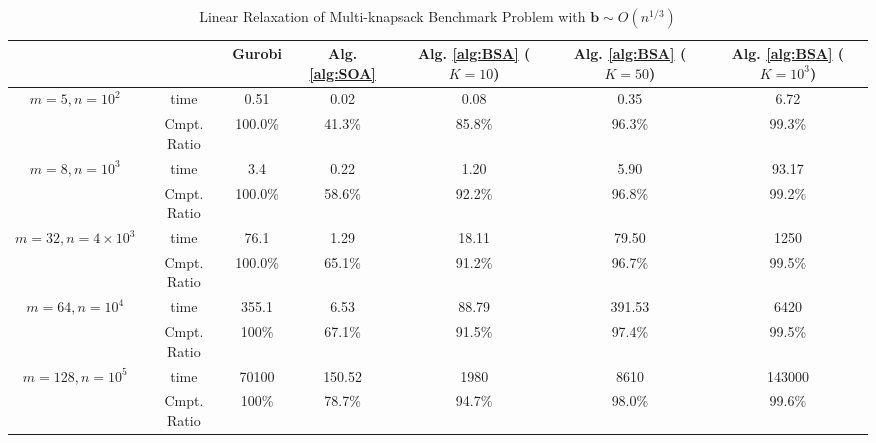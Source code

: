 \documentclass{article} %
\begin{document}
\begin{table}[ht!]
    \centering
    \small
    \begin{tabular}{cc|c|c|c|c|c}
    \toprule
         && Gurobi  & Alg. \ref{alg:SOA} & Alg. \ref{alg:BSA} ($K=10$) & Alg. \ref{alg:BSA} ($K=50$) & Alg. \ref{alg:BSA}  ($K=10^3$) \\
         \midrule
   \multirow{2}{*}{\scriptsize $m=5, n=10^2$}  & time & 0.51 & 0.02 & 0.08 & 0.35 & 6.72 \\
   & Cmpt. Ratio &100.0\% & 41.3\% & 85.8\% &  96.3\% & 99.3\%  \\
\midrule
  \multirow{2}{*}{\scriptsize $m=8, n=10^3$} &  time  & 3.4 & 0.22  & 1.20 & 5.90 & 93.17  \\ 
   &Cmpt. Ratio & 100.0\% & 58.6\% & 92.2\% & 96.8\% & 99.2\%   \\
\midrule
    \multirow{2}{*}{\scriptsize $m=32, n=4\times10^3$} &  time   &  76.1  & 1.29 & 18.11 & 79.50 & 1250  \\ 
  & Cmpt. Ratio & 100.0\% & 65.1\% & 91.2\% &  96.7\% & 99.5\% \\
\midrule
    \multirow{2}{*}{\scriptsize $m=64, n=10^4$} &  time   &  355.1  & 6.53  & 88.79 & 391.53 & 6420 \\ 
  & Cmpt. Ratio & 100\% & 67.1\% &  91.5\% & 97.4\% & 99.5\% \\ 
\midrule
    \multirow{2}{*}{\scriptsize $m=128, n=10^5$} &  time   &  70100  & 150.52 & 1980&  8610 & 143000  \\ 
  & Cmpt. Ratio & 100\% & 78.7\% & 94.7\% & 98.0\% & 99.6\% \\  
   \bottomrule
    \end{tabular}
        \caption{Linear Relaxation of Multi-knapsack Benchmark Problem with $\bm{b}\sim O(n^{1/3})$}
    \label{tab:sol_1/3}
\end{table}
\end{document}
